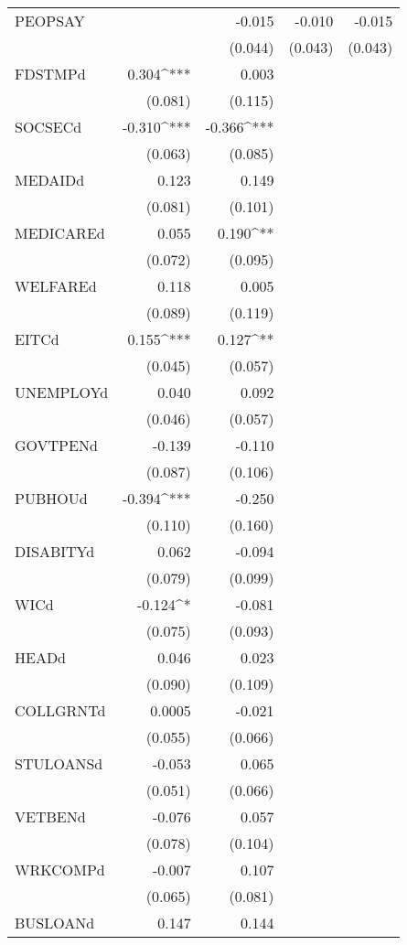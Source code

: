 \begin{table}[!htbp]
\begin{tabular}{@{\extracolsep{5pt}}lD{.}{.}{-3} D{.}{.}{-3} D{.}{.}{-3} D{.}{.}{-3} }
  PEOPSAY &  & -0.015 & -0.010 & -0.015 \\ 
  &  & (0.044) & (0.043) & (0.043) \\ 
  FDSTMPd & 0.304^{***} & 0.003 &  &  \\ 
  & (0.081) & (0.115) &  &  \\ 
  SOCSECd & -0.310^{***} & -0.366^{***} &  &  \\ 
  & (0.063) & (0.085) &  &  \\ 
  MEDAIDd & 0.123 & 0.149 &  &  \\ 
  & (0.081) & (0.101) &  &  \\ 
  MEDICAREd & 0.055 & 0.190^{**} &  &  \\ 
  & (0.072) & (0.095) &  &  \\ 
  WELFAREd & 0.118 & 0.005 &  &  \\ 
  & (0.089) & (0.119) &  &  \\ 
  EITCd & 0.155^{***} & 0.127^{**} &  &  \\ 
  & (0.045) & (0.057) &  &  \\ 
  UNEMPLOYd & 0.040 & 0.092 &  &  \\ 
  & (0.046) & (0.057) &  &  \\ 
  GOVTPENd & -0.139 & -0.110 &  &  \\ 
  & (0.087) & (0.106) &  &  \\ 
  PUBHOUd & -0.394^{***} & -0.250 &  &  \\ 
  & (0.110) & (0.160) &  &  \\ 
  DISABITYd & 0.062 & -0.094 &  &  \\ 
  & (0.079) & (0.099) &  &  \\ 
  WICd & -0.124^{*} & -0.081 &  &  \\ 
  & (0.075) & (0.093) &  &  \\ 
  HEADd & 0.046 & 0.023 &  &  \\ 
  & (0.090) & (0.109) &  &  \\ 
  COLLGRNTd & 0.0005 & -0.021 &  &  \\ 
  & (0.055) & (0.066) &  &  \\ 
  STULOANSd & -0.053 & 0.065 &  &  \\ 
  & (0.051) & (0.066) &  &  \\ 
  VETBENd & -0.076 & 0.057 &  &  \\ 
  & (0.078) & (0.104) &  &  \\ 
  WRKCOMPd & -0.007 & 0.107 &  &  \\ 
  & (0.065) & (0.081) &  &  \\ 
  BUSLOANd & 0.147 & 0.144 &  &  \\ 

\end{tabular}
\end{table}
